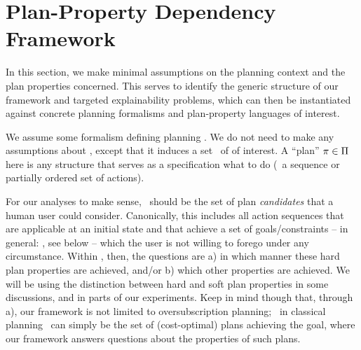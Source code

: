 \section{Plan-Property Dependency Framework}


In this section, we make minimal assumptions on the planning context
and the plan properties concerned. This serves to identify the generic
structure of our framework and targeted explainability problems, which
can then be instantiated against concrete planning formalisms and
plan-property languages of interest.

We assume some formalism defining planning  \task. We
do not need to make any assumptions about \task, except that it
induces a set \plans\ of  of interest. A ``plan''
$\pi \in \Pi$ here is any structure that serves as a
specification what to do (\eg\ a sequence or partially ordered set of
actions).
%
%

For our analyses to make sense, \plans\ should be the set of plan
\emph{candidates} that a human user could consider. Canonically, this
includes all action sequences that are applicable at an initial state
and that achieve a set of  goals/constraints -- in
general: , see below -- which the user is not
willing to forego under any circumstance. Within \plans, then, the
questions are a) in which manner these hard plan properties are
achieved, and/or b) which other  properties are
achieved. We will be using the distinction between hard and soft plan
properties in some discussions, and in parts of our experiments. Keep
in mind though that, through a), our framework is not limited to
oversubscription planning; \eg\ in classical planning \plans\ can
simply be the set of (cost-optimal) plans achieving the goal, where
our framework answers questions about the properties of such plans.



